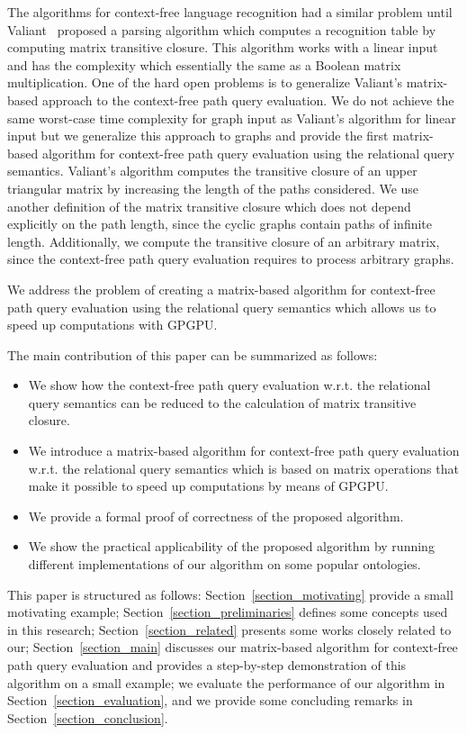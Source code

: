The algorithms for context-free language recognition had a similar problem until Valiant~\cite{valiant} proposed a parsing algorithm which computes a recognition table by computing matrix transitive closure. This algorithm works with a linear input and has the complexity which essentially the same as a Boolean matrix multiplication. One of the hard open problems is to generalize Valiant's matrix-based approach to the context-free path query evaluation. We do not achieve the same worst-case time complexity for graph input as Valiant's algorithm for linear input but we generalize this approach to graphs and provide the first matrix-based algorithm for context-free path query evaluation using the relational query semantics. Valiant's algorithm computes the transitive closure of an upper triangular matrix by increasing the length of the paths considered. We use another definition of the matrix transitive closure which does not depend explicitly on the path length, since the cyclic graphs contain paths of infinite length. Additionally, we compute the transitive closure of an arbitrary matrix, since the context-free path query evaluation requires to process arbitrary graphs. 

We address the problem of creating a matrix-based algorithm for context-free path query evaluation using the relational query semantics which allows us to speed up computations with GPGPU.

The main contribution of this paper can be summarized as follows:
\begin{itemize}
	\item We show how the context-free path query evaluation w.r.t. the relational query semantics can be reduced to the calculation of matrix transitive closure.
	\item We introduce a matrix-based algorithm for context-free path query evaluation w.r.t. the relational query semantics which is based on matrix operations that make it possible to speed up computations by means of GPGPU.
	\item We provide a formal proof of correctness of the proposed algorithm.
	\item We show the practical applicability of the proposed algorithm by running different implementations of our algorithm on some popular ontologies.
\end{itemize}

This paper is structured as follows: Section~\ref{section_motivating} provide a small motivating example; Section~\ref{section_preliminaries} defines some concepts used in this research; Section~\ref{section_related} presents some works closely related to our; Section~\ref{section_main} discusses our matrix-based algorithm for context-free path query evaluation and provides a step-by-step demonstration of this algorithm on a small example;  we evaluate the performance of our algorithm in Section~\ref{section_evaluation}, and we provide some concluding remarks in Section~\ref{section_conclusion}.
